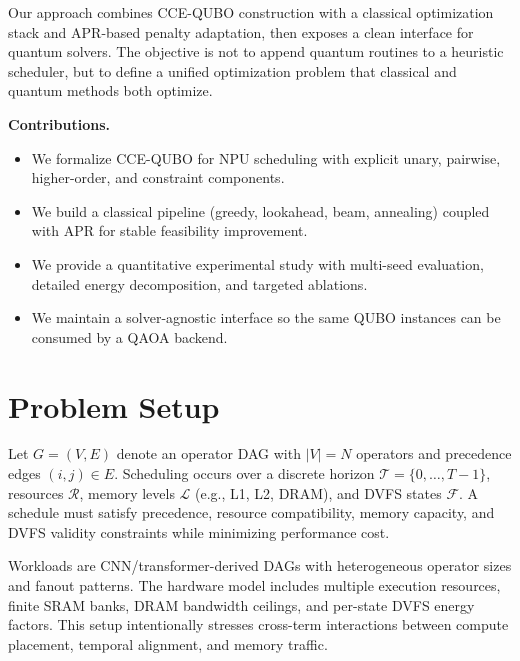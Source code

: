 \documentclass{article}
\begin{document}
Our approach combines CCE-QUBO construction with a classical optimization stack and APR-based penalty adaptation, then exposes a clean interface for quantum solvers. The objective is not to append quantum routines to a heuristic scheduler, but to define a unified optimization problem that classical and quantum methods both optimize.

\noindent\textbf{Contributions.}
\begin{itemize}
\item We formalize CCE-QUBO for NPU scheduling with explicit unary, pairwise, higher-order, and constraint components.
\item We build a classical pipeline (greedy, lookahead, beam, annealing) coupled with APR for stable feasibility improvement.
\item We provide a quantitative experimental study with multi-seed evaluation, detailed energy decomposition, and targeted ablations.
\item We maintain a solver-agnostic interface so the same QUBO instances can be consumed by a QAOA backend.
\end{itemize}

\section{Problem Setup}
Let $G=(V,E)$ denote an operator DAG with $|V|=N$ operators and precedence edges $(i,j)\in E$. Scheduling occurs over a discrete horizon $\mathcal{T}=\{0,\dots,T-1\}$, resources $\mathcal{R}$, memory levels $\mathcal{L}$ (e.g., L1, L2, DRAM), and DVFS states $\mathcal{F}$. A schedule must satisfy precedence, resource compatibility, memory capacity, and DVFS validity constraints while minimizing performance cost.

Workloads are CNN/transformer-derived DAGs with heterogeneous operator sizes and fanout patterns. The hardware model includes multiple execution resources, finite SRAM banks, DRAM bandwidth ceilings, and per-state DVFS energy factors. This setup intentionally stresses cross-term interactions between compute placement, temporal alignment, and memory traffic.
\end{document}
